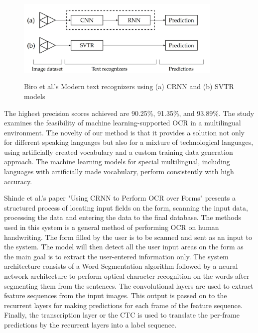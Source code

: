 \begin{figure}[ht]
    \centering
    \includegraphics[width=0.88\textwidth]{Figures/CRNN_Papers/Biro_2023.jpg}
    \caption[Biro et al.'s Modern Recogniser]{Biro et al.'s Modern text recognizers using (a) CRNN and (b) SVTR models}\cite{biroSynthetizedMultilanguageOCR2023}
    \label{fig:Biro et al.'s Modern text recognizers using CRNN and SVTR models}
\end{figure}


The highest precision scores achieved are 90.25\%, 91.35\%, and 93.89\%. The study examines the feasibility of machine learning-supported OCR in a multilingual environment. The novelty of our method is that it provides a solution not only for different speaking languages but also for a mixture of technological languages, using artificially created vocabulary and a custom training data generation approach. The machine learning models for special multilingual, including languages with artificially made vocabulary, perform consistently with high accuracy. \cite{biroSynthetizedMultilanguageOCR2023}



Shinde et al.'s paper "Using CRNN to Perform OCR over Forms"  presents a structured process of locating input fields on the form, scanning the input data, processing the data and entering the data to the final database. The methods used in this system is a general method of performing OCR on human handwriting. The form filled by the user is to be scanned and sent as an input to the system. The model will then detect all the user input areas on the form as the main goal is to extract the user-entered information only. The system architecture consists of a Word Segmentation algorithm followed by a neural network architecture to perform optical character recognition on the words after segmenting them from the sentences. The convolutional layers are used to extract feature sequences from the input images. This output is passed on to the recurrent layers for making predictions for each frame of the feature sequence. Finally, the transcription layer or the CTC is used to translate the per-frame predictions by the recurrent layers into a label sequence.


